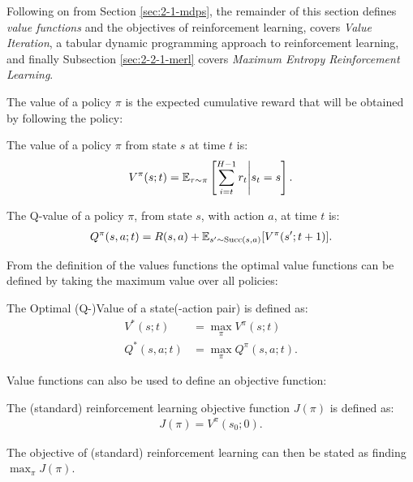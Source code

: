     Following on from Section \ref{sec:2-1-mdps}, the remainder of this section defines \textit{value functions} and the objectives of reinforcement learning, covers \textit{Value Iteration}, a tabular dynamic programming approach to reinforcement learning, and finally Subsection \ref{sec:2-2-1-merl} covers \textit{Maximum Entropy Reinforcement Learning}.
    
    The value of a policy $\pi$ is the expected cumulative reward that will be obtained by following the policy:
    \begin{defn}
        \label{def:value}
        \label{def:q_value}
        The \textnormal{value} of a policy $\pi$ from state $s$ at time $t$ is:
        \begin{align}
            V^{\pi}(s;t) = \mathbb{E}_{\tau\sim\pi}\left[\sum_{i=t}^{H-1} r_t \Bigg| s_t=s \right]. \label{eq:value_fn_def}
        \end{align} 

        The \textnormal{Q-value} of a policy $\pi$, from state $s$, with action $a$, at time $t$ is:
        \begin{align}
            Q^{\pi}(s,a;t) = R(s,a) + \mathbb{E}_{s'\sim {\textnormal{Succ}(s,a)}} [V^{\pi}(s';t+1)]. \label{eq:q_value_fn_def}
        \end{align} 
    \end{defn}

    From the definition of the values functions the optimal value functions can be defined by taking the maximum value over all policies:
    \begin{defn}
        \label{def:optimal_value}
        \label{def:optimal_q_value}
        The \textnormal{Optimal (Q-)Value} of a state(-action pair) is defined as:
        \begin{align}
            V^*(s;t) &= \max_{\pi} V^{\pi}(s;t) \label{eq:opt_value_fn_def} \\
            Q^*(s,a;t) &= \max_{\pi} Q^{\pi}(s,a;t). \label{eq:opt_q_value_fn_def}
        \end{align}
    \end{defn}

    Value functions can also be used to define an objective function:
    \begin{defn}
        \label{def:rl_obj_fn}
        The \textnormal{(standard) reinforcement learning objective function} $J(\pi)$ is defined as:
        \begin{align}
            J(\pi) = V^{\pi}(s_0;0). \label{eq:rl_obj_fn_def}
        \end{align}

        The objective of (standard) reinforcement learning can then be stated as finding $\max_{\pi} J(\pi)$.
    \end{defn}

